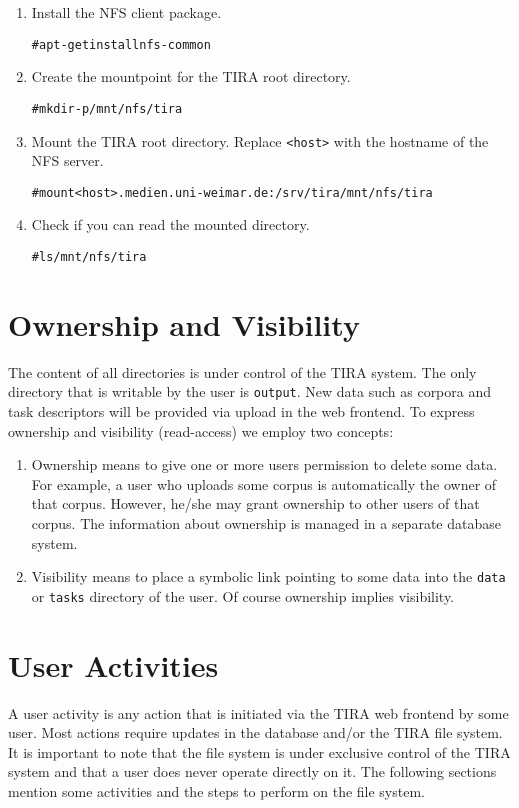 \documentclass[12pt,a4paper,oneside,titlepage,draft]{report}
\newcommand{\tira}{TIRA\xspace}
\newenvironment{code}
  {\small\color{RubineRed}\begin{alltt}}
  {\end{alltt}}
\begin{document}
\begin{enumerate}
\item Install the NFS client package.
\begin{code}
# apt-get install nfs-common
\end{code}
\item Create the mountpoint for the \tira root directory.
\begin{code}
# mkdir -p /mnt/nfs/tira
\end{code}
\item Mount the \tira root directory. Replace \texttt{<host>} with the hostname of the NFS server.
\begin{code}
# mount <host>.medien.uni-weimar.de:/srv/tira /mnt/nfs/tira
\end{code}
\item Check if you can read the mounted directory.
\begin{code}
# ls /mnt/nfs/tira
\end{code}
\end{enumerate}

\section{Ownership and Visibility}
The content of all directories is under control of the \tira system. The only directory that is writable by the user is \texttt{output}. New data such as corpora and task descriptors will be provided via upload in the web frontend. To express ownership and visibility (read-access) we employ two concepts:

\begin{enumerate}
\item Ownership means to give one or more users permission to delete some data. For example, a user who uploads some corpus is automatically the owner of that corpus. However, he/she may grant ownership to other users of that corpus. The information about ownership is managed in a separate database system.

\item Visibility means to place a symbolic link pointing to some data into the \texttt{data} or \texttt{tasks} directory of the user. Of course ownership implies visibility.
\end{enumerate}

\section{User Activities}
A user activity is any action that is initiated via the \tira web frontend by some user. Most actions require updates in the database and/or the \tira file system. It is important to note that the file system is under exclusive control of the \tira system and that a user does never operate directly on it. The following sections mention some activities and the steps to perform on the file system.
\end{document}
